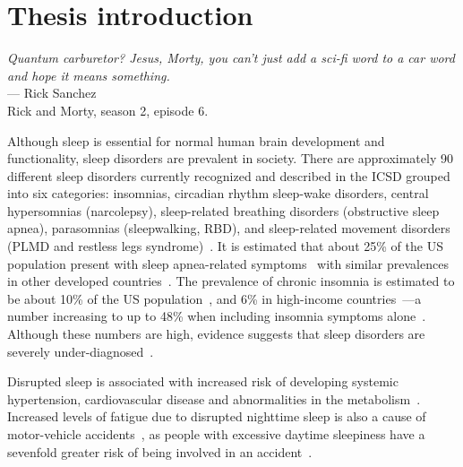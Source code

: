 \chapter{Thesis introduction}\label{chap:thesis-introduction}

\begin{flushright}{\slshape 
        Quantum carburetor? Jesus, Morty, you can't just add a sci-fi word to a car word and hope it means something.} \\ \medskip
        --- Rick Sanchez\\Rick and Morty, season 2, episode 6.
\end{flushright}
\vspace{6cm}

Although sleep is essential for normal human brain development and functionality, sleep disorders are prevalent in society.
There are approximately 90 different sleep disorders currently recognized and described in the \ac{ICSD} grouped into six categories: insomnias, circadian rhythm sleep-wake disorders, central hypersomnias (\eg narcolepsy), sleep-related breathing disorders (\eg obstructive sleep apnea), parasomnias (\eg sleepwalking, \acl{RBD}), and sleep-related movement disorders (\eg \acl{PLMD} and restless legs syndrome)~\cite{AmericanAcademyofSleepMedicine2014}.
It is estimated that about 25\% of the US population present with sleep apnea-related symptoms~\cite{Young2002, Gottlieb2020} with similar prevalences in other developed countries~\cite{Tufik2010, Heinzer2015, Arnardottir2016, Fietze2019}.
The prevalence of chronic insomnia is estimated to be about 10\% of the US population~\cite{Ozminkowski2007}, and 6\% in high-income countries~\cite{Ohayon2002}---a number increasing to up to 48\% when including insomnia symptoms alone~\cite{Ohayon2002}. 
Although these numbers are high, evidence suggests that sleep disorders are severely under-diagnosed~\cite{Decker2008, Ohayon2011, Johnson2018}. 

Disrupted sleep is associated with increased risk of developing systemic hypertension, cardiovascular disease and abnormalities in the metabolism~\cite{Punjabi2008}.
Increased levels of fatigue due to disrupted nighttime sleep is also a cause of motor-vehicle accidents~\cite{Lyznicki1998}, as people with excessive daytime sleepiness have a sevenfold greater risk of being involved in an accident~\cite{Findley1988}.

